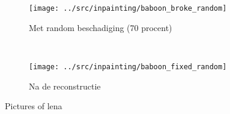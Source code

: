 \begin{figure}
    \centering
    \begin{subfigure}[b]{0.45\textwidth}
        \texttt{[image: ../src/inpainting/baboon\_broke\_random]}
        \caption{Met random beschadiging (70 procent)}
        \label{fig:tiger}
    \end{subfigure}
    ~ %
    \begin{subfigure}[b]{0.45\textwidth}
        \texttt{[image: ../src/inpainting/baboon\_fixed\_random]}
        \caption{Na de reconstructie}
        \label{fig:mouse}
    \end{subfigure}
    \caption{Pictures of lena}\label{fig:baboon}
\end{figure}


